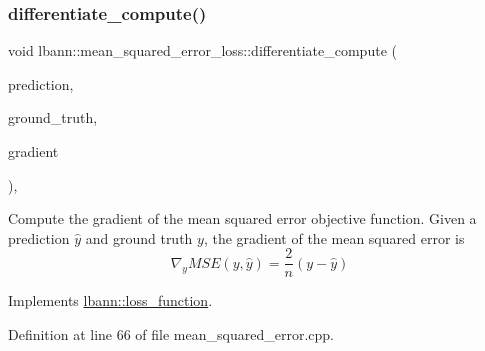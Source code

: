 \subsubsection{\texorpdfstring{differentiate\+\_\+compute()}{differentiate\_compute()}}
{\footnotesize\ttfamily void lbann\+::mean\+\_\+squared\+\_\+error\+\_\+loss\+::differentiate\+\_\+compute (\begin{DoxyParamCaption}\item[{const \hyperlink{base_8hpp_a9a697a504ae84010e7439ffec862b470}{Abs\+Dist\+Mat} \&}]{prediction,  }\item[{const \hyperlink{base_8hpp_a9a697a504ae84010e7439ffec862b470}{Abs\+Dist\+Mat} \&}]{ground\+\_\+truth,  }\item[{\hyperlink{base_8hpp_a9a697a504ae84010e7439ffec862b470}{Abs\+Dist\+Mat} \&}]{gradient }\end{DoxyParamCaption})\hspace{0.3cm}{\ttfamily [override]}, {\ttfamily [virtual]}}

Compute the gradient of the mean squared error objective function. Given a prediction $\hat{y}$ and ground truth $y$, the gradient of the mean squared error is \[ \nabla_y MSE (y,\hat{y}) = \frac{2}{n} (y - \hat{y}) \] 

Implements \hyperlink{classlbann_1_1loss__function_aefccc2b4f5a02664002d12630cf369e7}{lbann\+::loss\+\_\+function}.



Definition at line 66 of file mean\+\_\+squared\+\_\+error.\+cpp.


